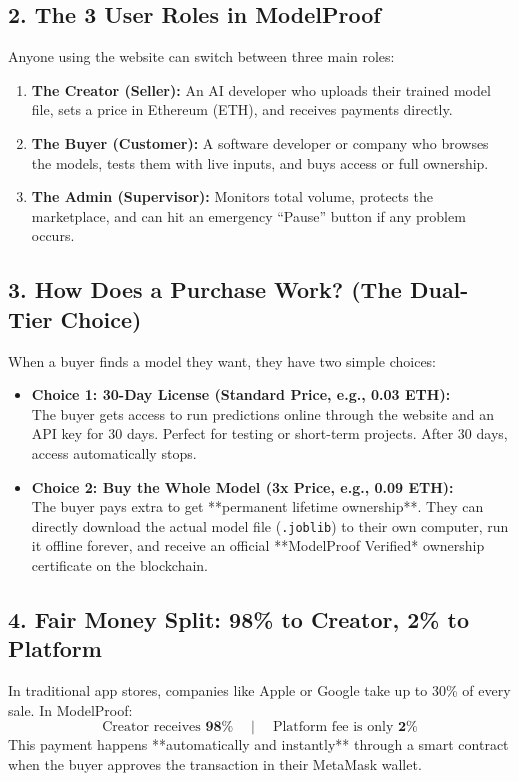 \documentclass[12pt,a4paper]{article}
\begin{document}
\subsection{2. The 3 User Roles in ModelProof}
Anyone using the website can switch between three main roles:
\begin{enumerate}[label=\textbf{(\alph*)}]
    \item \textbf{The Creator (Seller):} An AI developer who uploads their trained model file, sets a price in Ethereum (ETH), and receives payments directly.
    \item \textbf{The Buyer (Customer):} A software developer or company who browses the models, tests them with live inputs, and buys access or full ownership.
    \item \textbf{The Admin (Supervisor):} Monitors total volume, protects the marketplace, and can hit an emergency ``Pause'' button if any problem occurs.
\end{enumerate}

\subsection{3. How Does a Purchase Work? (The Dual-Tier Choice)}
When a buyer finds a model they want, they have two simple choices:
\begin{itemize}[leftmargin=1.5em]
    \item \textbf{Choice 1: 30-Day License (Standard Price, e.g., 0.03 ETH):} \\
    The buyer gets access to run predictions online through the website and an API key for 30 days. Perfect for testing or short-term projects. After 30 days, access automatically stops.
    \item \textbf{Choice 2: Buy the Whole Model (3x Price, e.g., 0.09 ETH):} \\
    The buyer pays extra to get **permanent lifetime ownership**. They can directly download the actual model file (\texttt{.joblib}) to their own computer, run it offline forever, and receive an official **ModelProof Verified\texttrademark** ownership certificate on the blockchain.
\end{itemize}

\subsection{4. Fair Money Split: 98\% to Creator, 2\% to Platform}
In traditional app stores, companies like Apple or Google take up to 30\% of every sale. In ModelProof:
\begin{equation*}
    \text{Creator receives } \mathbf{98\%} \quad \mid \quad \text{Platform fee is only } \mathbf{2\%}
\end{equation*}
This payment happens **automatically and instantly** through a smart contract when the buyer approves the transaction in their MetaMask wallet.
\end{document}
